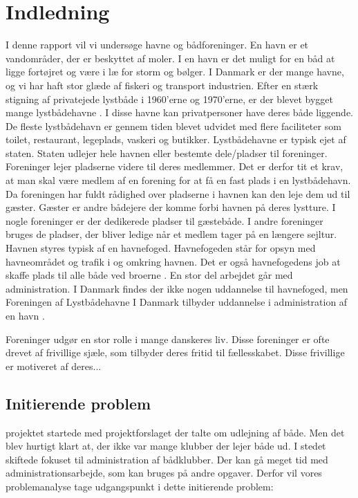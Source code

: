 \chapter{Indledning}
I denne rapport vil vi undersøge havne og bådforeninger. En havn er et vandområder, der er beskyttet af moler. I en havn er det muligt for en båd at ligge fortøjret og være i læ for storm og bølger. I Danmark er der mange havne, og vi har haft stor glæde af fiskeri og transport industrien. Efter en stærk stigning af privatejede lystbåde i 1960'erne og 1970'erne, er der blevet bygget mange lystbådehavne \cite{gyldendal_redaktionen_havn_2013}. I disse havne kan privatpersoner have deres både liggende. De fleste lystbådehavn er gennem tiden blevet udvidet med flere faciliteter som toilet, restaurant, legeplads, vaskeri og butikker. Lystbådehavne er typisk ejet af staten. Staten udlejer hele havnen eller bestemte dele/pladser til foreninger. Foreninger lejer pladserne videre til deres medlemmer. Det er derfor tit et krav, at man skal være medlem af en forening for at få en fast plads i en lystbådehavn. Da foreningen har fuldt rådighed over pladserne i havnen kan den leje dem ud til gæster. Gæster er andre bådejere der komme forbi havnen på deres lystture. I nogle foreninger er der dedikerede pladser til gæstebåde. I andre foreninger bruges de pladser, der bliver ledige når et medlem tager på en længere sejltur.
Havnen styres typisk af en havnefoged. Havnefogeden står for opsyn med havneområdet og trafik i og omkring havnen. Det er også havnefogedens job at skaffe plads til alle både ved broerne \cite{undervisningsministeriet_havnefoged_2014}. En stor del arbejdet går med administration. I Danmark findes der ikke nogen uddannelse til havnefoged, men Foreningen af Lystbådehavne I Danmark tilbyder uddannelse i administration af en havn \cite{lystbadehavne_i_danmark}.

Foreninger udgør en stor rolle i mange danskeres liv. Disse foreninger er ofte drevet af frivillige sjæle, som tilbyder deres fritid til fællesskabet. Disse frivillige er motiveret af deres... 

\section{Initierende problem}
\label{initierende}
projektet startede med projektforslaget der talte om udlejning af både. Men det blev hurtigt klart at, der ikke var mange klubber der lejer både ud. I stedet skiftede fokuset til administration af bådklubber. Der kan gå meget tid med administrationsarbejde, som kan bruges på andre opgaver. Derfor vil vores problemanalyse tage udgangspunkt i dette initierende problem:


